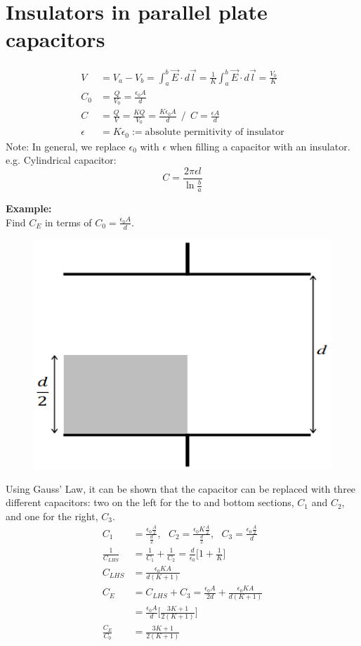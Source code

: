 \documentclass[a4paper, 11pt, normalem]{report}
\begin{document}
\section{Insulators in parallel plate capacitors}
\begin{align}
    V &= V_{a} - V_{b} = \int_{a}^{b} \vec{E} \cdot d\vec{l} = \frac{1}{K} \int_{a}^{b} \vec{E}\cdot d\vec{l} = \frac{V_{0}}{K} \\
    C_{0} &= \frac{Q}{V_{0}} = \frac{\epsilon_{0} A}{d} \\
    C &= \frac{Q}{V} = \frac{KQ}{V_{0}} = \frac{K\epsilon_{0}A}{d} ~~ \Big/ ~~ C = \frac{\epsilon A}{d} \\
    \epsilon &= K\epsilon_{0} := \text{absolute permitivity of insulator}
\end{align}
Note: In general, we replace $\epsilon_{0}$ with $\epsilon$ when filling a capacitor with an insulator.
e.g. Cylindrical capacitor:
\begin{equation}
    C = \frac{2\pi\epsilon l}{\ln\tfrac{b}{a}}
\end{equation}

\textbf{Example:}\\
Find $C_{E}$ in terms of $C_{0} = \frac{\epsilon_{0}A}{d}$.
\begin{figure}[H]
    \centering
    \includegraphics[scale=0.5]{Cap2.png}
\end{figure}
Using Gauss' Law, it can be shown that the capacitor can be replaced with three different capacitors: two on the left for the to and bottom sections, $C_{1}$ and $C_{2}$, and one for the right, $C_{3}$.
\begin{align}
    C_{1} &= \frac{\epsilon_{0}\tfrac{A}{2}}{\tfrac{d}{2}}, ~~~ C_{2} = \frac{\epsilon_{0}K\tfrac{A}{2}}{\tfrac{d}{2}}, ~~~ C_{3} = \frac{\epsilon_{0}\tfrac{A}{2}}{d} \\
    \frac{1}{C_{LHS}} &= \frac{1}{C_{1}} + \frac{1}{C_{2}} = \frac{d}{\epsilon_{0}} \Big[1 + \frac{1}{K}\Big] \\
    C_{LHS} &= \frac{\epsilon_{0}KA}{d(K + 1)} \\
    C_{E} &= C_{LHS} + C_{3} = \frac{\epsilon_{0}A}{2d} + \frac{\epsilon_{0}KA}{d(K + 1)} \\
          &= \frac{\epsilon_{0}A}{d}\Big[\frac{3K + 1}{2(K + 1)}\Big] \\
    \frac{C_{E}}{C_{0}} &= \frac{3K + 1}{2(K + 1)}
\end{align}
\end{document}
